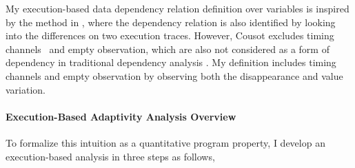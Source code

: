 {My execution-based data dependency relation definition over variables 
is inspired by the method in \cite{Cousot19a}, where the dependency relation is also identified by looking into the differences on two execution traces. 
However, Cousot excludes timing channels~\cite{SabelfeldM03} and empty observation, which are also not considered as a form of dependency in traditional dependency analysis \cite{DenningD77}.
My definition includes timing channels and empty observation by observing both the disappearance and value variation.
}
\paragraph*{Execution-Based Adaptivity Analysis Overview}
To formalize this intuition as a quantitative program property, I develop an execution-based analysis
 in three steps as follows,
